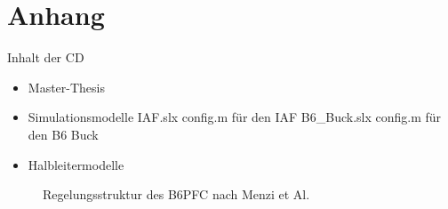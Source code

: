 \chapter{Anhang}
\setcounter{figure}{0}
\renewcommand{\thefigure}{A\arabic{figure}}

\setcounter{table}{0}
\renewcommand{\thetable}{A\arabic{table}}

\begin{table}
\caption{Inhalt der CD}
\begin{itemize}
	\item Master-Thesis
	\item Simulationsmodelle
		\subitem IAF.slx
		\subitem config.m für den IAF
		\subitem B6\_Buck.slx
		\subitem config.m für den B6 Buck
	
	\item Halbleitermodelle
	
\end{itemize}

\end{table}



\begin{figure}
	\centering
	\caption{Regelungsstruktur des \gls{B6PFC} nach Menzi et Al. \cite{13PWMPFC}}
	\label{fig:b6regelung}
\end{figure}



